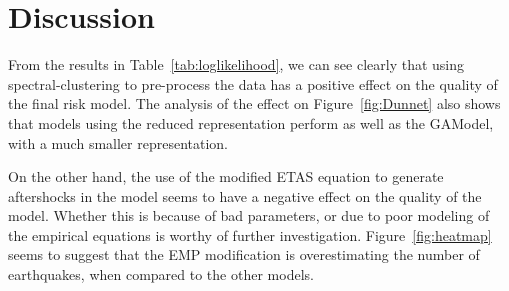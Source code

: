 \section{Discussion}
\label{sec:discussion}

From the results in Table~\ref{tab:loglikelihood}, we can see clearly
that using spectral-clustering to pre-process the data has a positive
effect on the quality of the final risk model. The analysis of the
effect on Figure~\ref{fig:Dunnet} also shows that models using the
reduced representation perform as well as the GAModel, with a much
smaller representation.

On the other hand, the use of the modified ETAS equation to generate
aftershocks in the model seems to have a negative effect on the
quality of the model. Whether this is because of bad parameters, or
due to poor modeling of the empirical equations is worthy of further
investigation. Figure~\ref{fig:heatmap} seems to suggest that the EMP
modification is overestimating the number of earthquakes, when
compared to the other models.

